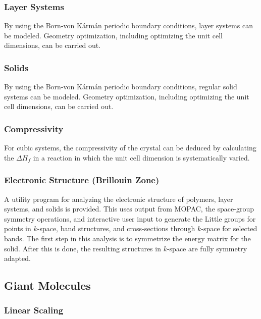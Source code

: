 \subsubsection*{Layer Systems }

By using the Born-von K\'{a}rm\'{a}n periodic boundary conditions, layer
systems can  be modeled.  Geometry optimization, including optimizing the unit
cell  dimensions, can be carried out.

\subsubsection*{Solids}

By using the Born-von K\'{a}rm\'{a}n periodic boundary conditions, regular
solid  systems can be modeled.  Geometry optimization, including optimizing the
unit  cell dimensions, can be carried out.

\subsubsection*{Compressivity}

For cubic systems, the compressivity of the crystal can be deduced by
calculating the $\Delta H_f$  in a reaction in which the unit cell dimension
is  systematically varied.

\subsubsection*{Electronic Structure (Brillouin Zone)}

A utility program for analyzing the electronic structure of polymers, layer
systems, and solids is provided.  This uses output from MOPAC, the  space-group
symmetry operations, and interactive user input to  generate the Little  groups
for points in $k$-space, band structures, and cross-sections  through
$k$-space  for selected bands.  The first step in this analysis is to
symmetrize the energy  matrix for the solid.  After this is done, the resulting
structures in $k$-space are  fully symmetry adapted.

\subsection{Giant Molecules}

\subsubsection*{Linear Scaling}


